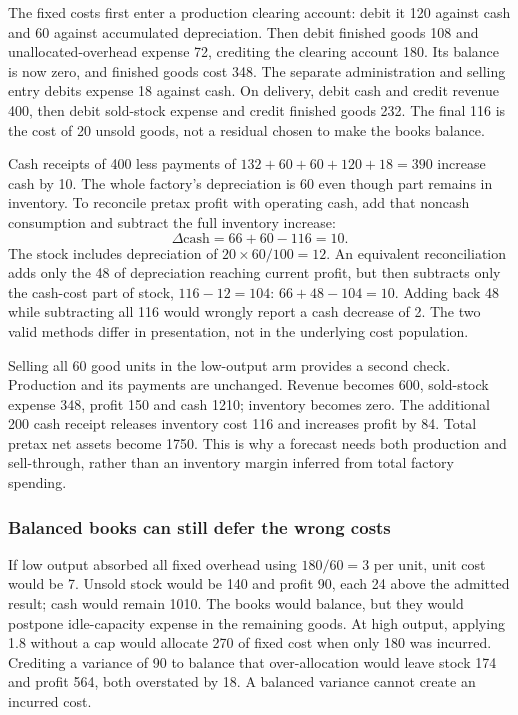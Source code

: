 The fixed costs first enter a production clearing account: debit it 120
against cash and 60 against accumulated depreciation. Then debit
finished goods 108 and unallocated-overhead expense 72, crediting the
clearing account 180. Its balance is now zero, and finished goods cost
348. The separate administration and selling entry debits expense 18
against cash. On delivery, debit cash and credit revenue 400, then debit
sold-stock expense and credit finished goods 232. The final 116 is the
cost of 20 unsold goods, not a residual chosen to make the books balance.

Cash receipts of 400 less payments of \(132+60+60+120+18=390\)
increase cash by 10. The whole factory's depreciation is 60 even though
part remains in inventory. To reconcile pretax profit with operating cash,
add that noncash consumption and subtract the full inventory increase:
\[
 \Delta\mathrm{cash}=66+60-116=10.
\]
The stock includes depreciation of
\(20\times60/100=12\). An equivalent reconciliation adds only the
48 of depreciation reaching current profit, but then subtracts only the
cash-cost part of stock, \(116-12=104\): \(66+48-104=10\).
Adding back 48 while subtracting all 116 would wrongly report a cash
decrease of 2. The two valid methods differ in presentation, not in the
underlying cost population.

Selling all 60 good units in the low-output arm provides a second check.
Production and its payments are unchanged. Revenue becomes 600,
sold-stock expense 348, profit 150 and cash 1210; inventory becomes zero.
The additional 200 cash receipt releases inventory cost 116 and increases
profit by 84. Total pretax net assets become 1750. This is why a forecast
needs both production and sell-through, rather than an inventory margin
inferred from total factory spending.

\subsubsection{Balanced books can still defer the wrong costs}

If low output absorbed all fixed overhead using \(180/60=3\) per
unit, unit cost would be 7. Unsold stock would be 140 and profit 90,
each 24 above the admitted result; cash would remain 1010. The books
would balance, but they would postpone idle-capacity expense in the
remaining goods. At high output, applying 1.8 without a cap would allocate
270 of fixed cost when only 180 was incurred. Crediting a variance of 90
to balance that over-allocation would leave stock 174 and profit 564,
both overstated by 18. A balanced variance cannot create an incurred cost.

